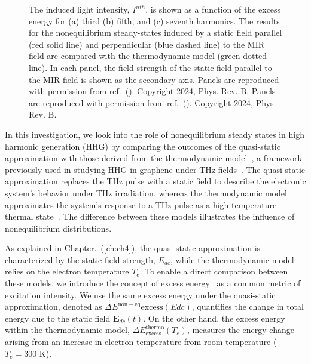 \begin{figure}[htp]
	\caption{\label{fig:intensity_tem}
		The induced light intensity, $I^{\textit{n}th}$, is shown as a function of the excess energy for (a) third (b) fifth, and (c) seventh harmonics. The results for the nonequilibrium steady-states induced by a static field parallel (red solid line) and perpendicular (blue dashed line) to the MIR field are compared with the thermodynamic model (green dotted line). In each panel, the field strength of the static field parallel to the MIR field is shown as the secondary axis. Panels are reproduced with permission from ref.~(\cite{PhysRevB.109.045421}). Copyright 2024, Phys. Rev. B. Panels are reproduced with permission from ref.~(\cite{PhysRevB.109.045421}). Copyright 2024, Phys. Rev. B.
	}
\end{figure}

In this investigation, we look into the role of nonequilibrium steady states in high harmonic generation (HHG) by comparing the outcomes of the quasi-static approximation with those derived from the thermodynamic model~\cite{mics2015thermodynamic}, a framework previously used in studying HHG in graphene under THz fields~\cite{Hafez2018,doi:10.1126/sciadv.abf9809}. The quasi-static approximation replaces the THz pulse with a static field to describe the electronic system's behavior under THz irradiation, whereas the thermodynamic model approximates the system's response to a THz pulse as a high-temperature thermal state~\cite{mics2015thermodynamic}. The difference between these models illustrates the influence of nonequilibrium distributions.

As explained in Chapter.~(\ref{ch:ch4}), the quasi-static approximation is characterized by the static field strength, $E_{dc}$, while the thermodynamic model relies on the electron temperature $T_e$. To enable a direct comparison between these models, we introduce the concept of excess energy~\cite{PhysRevB.106.024313} as a common metric of excitation intensity. We use the same excess energy under the quasi-static approximation, denoted as $\Delta E^{\mathrm{non-eq}}{\textrm{excess}}(E{dc})$, quantifies the change in total energy due to the static field $\mathbf E_{dc}(t)$. On the other hand, the excess energy within the thermodynamic model, $\Delta E^{\textrm{thermo}}_{\textrm{excess}}(T_e)$, measures the energy change arising from an increase in electron temperature from room temperature ($T_e=300$ K).

